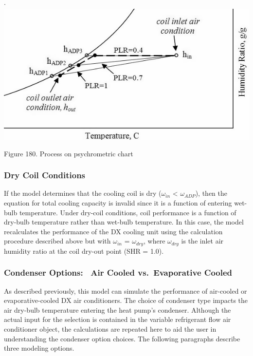 \(\cdot\) ~\includegraphics{media/image4182.png}

Figure 180. Process on psychrometric chart

\subsubsection{Dry Coil Conditions}\label{dry-coil-conditions-1}

If the model determines that the cooling coil is dry (\(\omega_{in}\) \textless{} \(\omega_{ADP}\)), then the equation for total cooling capacity is invalid since it is a function of entering wet-bulb temperature. Under dry-coil conditions, coil performance is a function of dry-bulb temperature rather than wet-bulb temperature. In this case, the model recalculates the performance of the DX cooling unit using the calculation procedure described above but with \(\omega_{in}\) = \(\omega_{dry}\), where \(\omega_{dry}\) is the inlet air humidity ratio at the coil dry-out point (SHR = 1.0).

\subsubsection{Condenser Options:~ Air Cooled vs.~Evaporative Cooled}\label{condenser-options-air-cooled-vs.evaporative-cooled}

As described previously, this model can simulate the performance of air-cooled or evaporative-cooled DX air conditioners. The choice of condenser type impacts the air dry-bulb temperature entering the heat pump's condenser. Although the actual input for the selection is contained in the variable refrigerant flow air conditioner object, the calculations are repeated here to aid the user in understanding the condenser option choices. The following paragraphs describe three modeling options.

